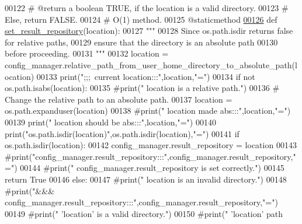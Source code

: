 \begin{DoxyCode}
00122     \textcolor{comment}{#   @return a boolean TRUE, if the location is a valid directory.}
00123     \textcolor{comment}{#       Else, return FALSE.}
00124     \textcolor{comment}{#   O(1) method.}
00125     @staticmethod
\hypertarget{configuration__manager_8py_source_l00126}{}\hyperlink{classutilities_1_1configuration__manager_1_1config__manager_a3ac8c649652805fc0bddd2b6d8187329}{00126}     \textcolor{keyword}{def }\hyperlink{classutilities_1_1configuration__manager_1_1config__manager_a3ac8c649652805fc0bddd2b6d8187329}{set\_result\_repository}(location):
00127         \textcolor{stringliteral}{"""}
00128 \textcolor{stringliteral}{            Since os.path.isdir returns false for relative paths,}
00129 \textcolor{stringliteral}{                ensure that the directory is an absolute path}
00130 \textcolor{stringliteral}{                    before proceeding.}
00131 \textcolor{stringliteral}{        """}
00132         location = config\_manager.relative\_path\_from\_user\_home\_directory\_to\_absolute\_path(location)
00133         print(\textcolor{stringliteral}{";;;~current location:::"},location,\textcolor{stringliteral}{"="})
00134         \textcolor{keywordflow}{if} \textcolor{keywordflow}{not} os.path.isabs(location):
00135             \textcolor{comment}{#print("    location is a relative path.")}
00136             \textcolor{comment}{# Change the relative path to an absolute path.}
00137             location = os.path.expanduser(location)
00138             \textcolor{comment}{#print("    location made abs:::",location,"=")}
00139         print(\textcolor{stringliteral}{" location should be abs:::"},location,\textcolor{stringliteral}{"="})
00140         print(\textcolor{stringliteral}{"os.path.isdir(location)"},os.path.isdir(location),\textcolor{stringliteral}{"="})
00141         \textcolor{keywordflow}{if} os.path.isdir(location):
00142             config\_manager.result\_repository = location
00143             \textcolor{comment}{#print("config\_manager.result\_repository:::",config\_manager.result\_repository,"=")}
00144             \textcolor{comment}{#print("    config\_manager.result\_repository is set correctly.")}
00145             \textcolor{keywordflow}{return} \textcolor{keyword}{True}
00146         \textcolor{keywordflow}{else}:
00147             \textcolor{comment}{#print("    location is an invalid directory.")}
00148             \textcolor{comment}{#print("&&& config\_manager.result\_repository:::",config\_manager.result\_repository,"=")}
00149             \textcolor{comment}{#print("    'location' is a valid directory.")}
00150             \textcolor{comment}{#print("    'location' path
}
\end{DoxyCode}
